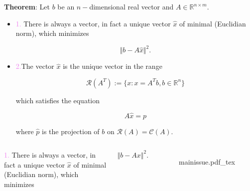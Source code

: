 \documentclass[aspectratio=169]{beamer}
\newcommand{\incfig}[2][1]{%
    \def\svgwidth{#1\columnwidth}
    {#2.pdf_tex} }
\begin{document}
\begin{frame}{} %
	
{\color{violet} \textbf{Theorem}:} Let $b$ be an $n-$dimensional real vector and $A \in \mathbb{R}^{n \times m}$.\\
	
\begin{itemize}
	\item \textcolor{violet}{1.} There is always a vector, in fact a unique vector $\hat{x}$ of minimal (Euclidian norm), which minimizes

	\[ \Vert b - A \hat{x} \Vert^2. \]
	
	\item \textcolor{violet}{2.}The vector $\hat{x}$ is the unique vector in the range
		
	\[ \mathcal{R}(A^T) := \{ x : x = A^T b, b\in \mathbb{R}^n  \} \]
	
	\noindent which satisfies the equation
	
	\[ A \hat{x} = p \]
	
	\noindent where $\hat{p}$ is the projection of $b$ on $\mathcal{R}(A) = \mathcal{C}(A).$

	\end{itemize}
\end{frame}

\begin{frame} %
	\begin{columns}
	

		\textcolor{violet}{1.} There is always a vector, in fact a unique vector $\hat{x}$ of minimal (Euclidian norm), which minimizes

		\[ \Vert b - A x \Vert^2. \]
		

\begin{figure}[ht]
    \centering
    \incfig{mainissue}
    \label{fig:minhatx}
\end{figure}

	\end{columns}
\end{frame}
\end{document}
